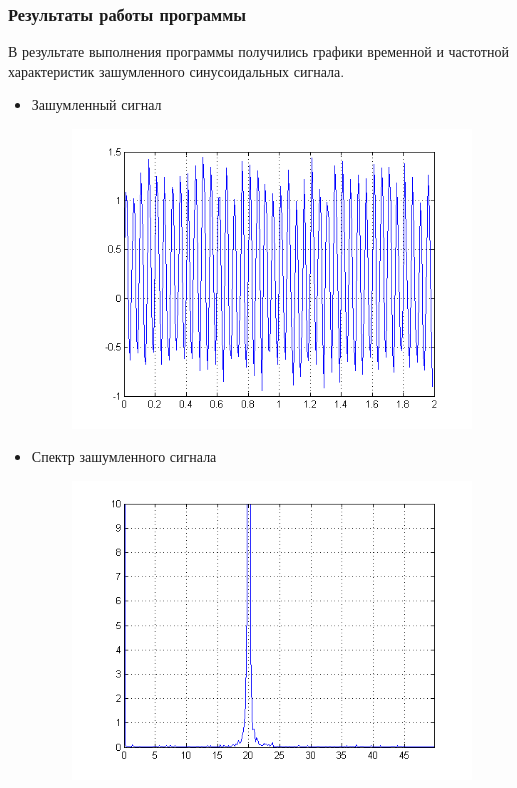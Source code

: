 \documentclass[10pt,a4paper]{article}
\begin{document}
\subsubsection{Результаты работы программы}
В результате выполнения программы получились графики временной и частотной характеристик зашумленного синусоидальных сигнала.
\begin{itemize}
\item Зашумленный сигнал
\begin{figure}[h]
\centering
\includegraphics[width=12cm]{3.png} 
\end{figure}
\item Спектр зашумленного сигнала
\begin{figure}[h]
\centering
\includegraphics[width=12cm]{4.png} 
\end{figure}
\end{itemize}
\FloatBarrier
\end{document}
